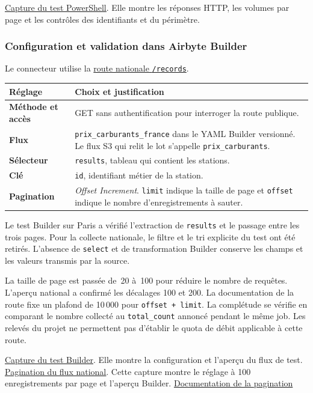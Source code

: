 \documentclass[11pt,a4paper]{article}
\newcommand{\code}[1]{\texttt{#1}}
\newcommand{\preuve}[2]{%
  \href{https://github.com/MAHDIghr/projet_big_data_starter/blob/27cc8348f6737a75bb24a40d6d8cda3ae54996b3/preuves/#1}{\textcolor{encre}{\underline{#2}}}}
\begin{document}
\preuve{api/api_01_carburants_test_terminal.png}{Capture du test PowerShell}.
Elle montre les réponses HTTP, les volumes par page et les contrôles
des identifiants et du périmètre.

\subsubsection{Configuration et validation dans Airbyte Builder}

Le connecteur utilise la
\href{https://data.economie.gouv.fr/api/explore/v2.1/catalog/datasets/prix-des-carburants-en-france-flux-instantane-v2/records}{route nationale \code{/records}}.

{\small
\begin{tabularx}{\linewidth}{@{}>{\bfseries}p{3.1cm}X@{}}
\toprule
Réglage & Choix et justification \\
\midrule
Méthode et accès &
GET sans authentification pour interroger la route publique. \\
Flux &
\code{prix\_carburants\_france} dans le YAML Builder versionné.
Le flux S3 qui relit le lot s'appelle \code{prix\_carburants}. \\
Sélecteur &
\code{results}, tableau qui contient les stations. \\
Clé &
\code{id}, identifiant métier de la station. \\
Pagination &
\emph{Offset Increment}. \code{limit} indique la taille de page
et \code{offset} indique le nombre d'enregistrements à sauter. \\
\bottomrule
\end{tabularx}
}

Le test Builder sur Paris a vérifié l'extraction de \code{results}
et le passage entre les trois pages. Pour la collecte nationale,
le filtre et le tri explicite du test ont été retirés. L'absence de
\code{select} et de transformation Builder conserve les champs et
les valeurs transmis par la source.

La taille de page est passée de~20 à~100 pour réduire le nombre
de requêtes. L'aperçu national a confirmé les décalages 100 et 200.
La documentation de la route fixe un plafond de 10\,000 pour
\code{offset + limit}. La complétude se vérifie en comparant le
nombre collecté au \code{total\_count} annoncé pendant le même job.
Les relevés du projet ne permettent pas d'établir le quota de débit
applicable à cette route.

\preuve{api/api_03_carburants_airbyte_builder.png}{Capture du test Builder}.
Elle montre la configuration et l'aperçu du flux de test.
\preuve{api/api_04_carburants_pagination_nationale.png}{Pagination du flux national}.
Cette capture montre le réglage à 100 enregistrements par page et
l'aperçu Builder.
\quad
\href{https://help.opendatasoft.com/apis/ods-explore-v2/}{Documentation de la pagination}
\end{document}
